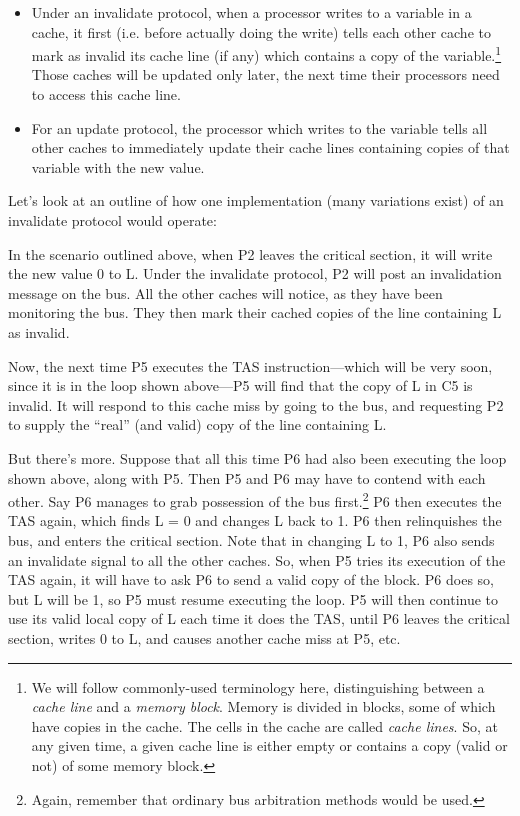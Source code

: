 \begin{itemize}

\item Under an invalidate protocol, when a processor writes to a
variable in a cache, it first (i.e. before actually doing the write)
tells each other cache to mark as invalid its cache line (if any) which
contains a copy of the variable.\footnote{We will follow commonly-used
terminology here, distinguishing between a {\it cache line} and a {\it
memory block}.  Memory is divided in blocks, some of which have copies
in the cache.  The cells in the cache are called {\it cache lines}.  So,
at any given time, a given cache line is either empty or contains a copy
(valid or not) of some memory block.} Those caches will be updated only
later, the next time their processors need to access this cache line.  

\item For an update protocol, the processor which writes to the variable
tells all other caches to immediately update their cache lines
containing copies of that variable with the new value. 

\end{itemize}

Let's look at an outline of how one implementation (many variations exist)
of an invalidate protocol would operate:

In the scenario outlined above, when P2 leaves the critical section, it
will write the new value 0 to L. Under the invalidate protocol, P2 will
post an invalidation message on the bus. All the other caches will
notice, as they have been monitoring the bus. They then mark their
cached copies of the line containing L as invalid.

Now, the next time P5 executes the TAS instruction---which will be very
soon, since it is in the loop shown above---P5 will find that the copy
of L in C5 is invalid. It will respond to this cache miss by going to
the bus, and requesting P2 to supply the ``real'' (and valid) copy of
the line containing L.

But there's more.  Suppose that all this time P6 had also been executing
the loop shown above, along with P5.  Then P5 and P6 may have to contend
with each other.  Say P6 manages to grab possession of the bus
first.\footnote{Again, remember that ordinary bus arbitration methods
would be used.} P6 then executes the TAS again, which finds L = 0 and
changes L back to 1.  P6 then relinquishes the bus, and enters the
critical section.  Note that in changing L to 1, P6 also sends an
invalidate signal to all the other caches.  So, when P5 tries its
execution of the TAS again, it will have to ask P6 to send a valid copy
of the block.  P6 does so, but L will be 1, so P5 must resume executing
the loop. P5 will then continue to use its valid local copy of L each
time it does the TAS, until P6 leaves the critical section, writes 0 to
L, and causes another cache miss at P5, etc.

